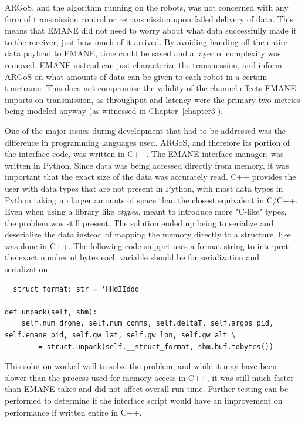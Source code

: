 ARGoS, and the algorithm running on the robots, was not concerned with any form of transmission control or retransmission upon failed delivery of data.
This means that EMANE did not need to worry about what data successfully made it to the receiver, just how much of it arrived.
By avoiding handing off the entire data payload to EMANE, time could be saved and a layer of complexity was removed.
EMANE instead can just characterize the transmission, and inform ARGoS on what amounts of data can be given to each robot in a certain timeframe.
This does not compromise the validity of the channel effects EMANE imparts on transmission, as throughput and latency were the primary two metrics being modeled anyway (as witnessed in Chapter~\ref{chapter3}).\par
One of the major issues during development that had to be addressed was the difference in programming languages used.
ARGoS, and therefore its portion of the interface code, was written in C++.
The EMANE interface manager, was written in Python.
Since data was being accessed directly from memory, it was important that the exact size of the data was accurately read.
C++ provides the user with data types that are not present in Python, with most data types in Python taking up larger amounts of space than the closest equivalent in C/C++.
Even when using a library like \textit{ctypes}, meant to introduce more "C-like" types, the problem was still present.
The solution ended up being to serialize and deserialize the data instead of mapping the memory directly to a structure, like was done in C++.
The following code snippet uses a format string to interpret the exact number of bytes each variable should be for serialization and serialization
\begin{verbatim}
__struct_format: str = 'HHdIIddd'

def unpack(self, shm):
	self.num_drone, self.num_comms, self.deltaT, self.argos_pid, self.emane_pid, self.gw_lat, self.gw_lon, self.gw_alt \
		= struct.unpack(self.__struct_format, shm.buf.tobytes())
\end{verbatim}
This solution worked well to solve the problem, and while it may have been slower than the process used for memory access in C++, it was still much faster than EMANE takes and did not affect overall run time.
Further testing can be performed to determine if the interface script would have an improvement on performance if written entire in C++.

